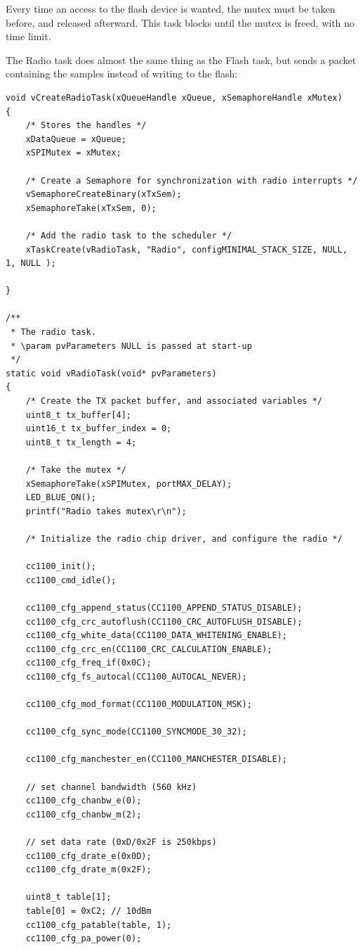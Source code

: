 \documentclass[11pt]{report}
\begin{document}
Every time an access to the flash device is wanted, the mutex must be taken before, and released afterward. This task blocks until the mutex is freed, with no time limit.

The Radio task does almost the same thing as the Flash task, but sends a packet containing the samples instead of writing to the flash:
\begin{verbatim}
void vCreateRadioTask(xQueueHandle xQueue, xSemaphoreHandle xMutex)
{
    /* Stores the handles */
    xDataQueue = xQueue;
    xSPIMutex = xMutex;
    
    /* Create a Semaphore for synchronization with radio interrupts */
    vSemaphoreCreateBinary(xTxSem);
    xSemaphoreTake(xTxSem, 0);
    
    /* Add the radio task to the scheduler */
    xTaskCreate(vRadioTask, "Radio", configMINIMAL_STACK_SIZE, NULL, 1, NULL );
    
}

/**
 * The radio task.
 * \param pvParameters NULL is passed at start-up
 */
static void vRadioTask(void* pvParameters)
{
    /* Create the TX packet buffer, and associated variables */
    uint8_t tx_buffer[4];
    uint16_t tx_buffer_index = 0;
    uint8_t tx_length = 4;
    
    /* Take the mutex */
    xSemaphoreTake(xSPIMutex, portMAX_DELAY);
    LED_BLUE_ON();
    printf("Radio takes mutex\r\n");
    
    /* Initialize the radio chip driver, and configure the radio */
    
    cc1100_init();
    cc1100_cmd_idle();
    
    cc1100_cfg_append_status(CC1100_APPEND_STATUS_DISABLE);
    cc1100_cfg_crc_autoflush(CC1100_CRC_AUTOFLUSH_DISABLE);
    cc1100_cfg_white_data(CC1100_DATA_WHITENING_ENABLE);
    cc1100_cfg_crc_en(CC1100_CRC_CALCULATION_ENABLE);
    cc1100_cfg_freq_if(0x0C);
    cc1100_cfg_fs_autocal(CC1100_AUTOCAL_NEVER);

    cc1100_cfg_mod_format(CC1100_MODULATION_MSK);

    cc1100_cfg_sync_mode(CC1100_SYNCMODE_30_32);

    cc1100_cfg_manchester_en(CC1100_MANCHESTER_DISABLE);

    // set channel bandwidth (560 kHz)
    cc1100_cfg_chanbw_e(0);
    cc1100_cfg_chanbw_m(2);

    // set data rate (0xD/0x2F is 250kbps)
    cc1100_cfg_drate_e(0x0D);
    cc1100_cfg_drate_m(0x2F);

    uint8_t table[1];
    table[0] = 0xC2; // 10dBm
    cc1100_cfg_patable(table, 1);
    cc1100_cfg_pa_power(0);
    

\end{verbatim}
\end{document}
